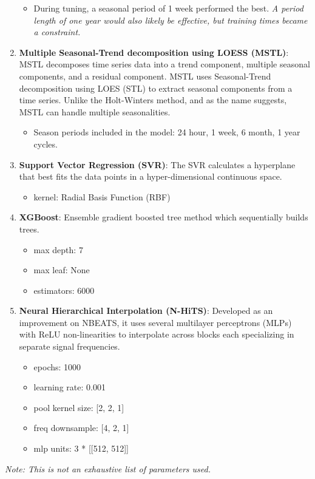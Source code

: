 \documentclass[sigconf]{acmart}
\begin{document}
\begin{enumerate}
      \begin{itemize} %
      \item During tuning, a seasonal period of 1 week performed the best. \textit{A period length of one year would also likely be effective, but training times became a constraint.}
      \end{itemize} %
    \item\textbf{Multiple Seasonal-Trend decomposition using LOESS (MSTL)}: MSTL decomposes time series data into a trend component, multiple seasonal components, and a residual component. MSTL uses Seasonal-Trend decomposition using LOES (STL) to extract seasonal components from a time series. Unlike the Holt-Winters method, and as the name suggests, MSTL can handle multiple seasonalities.
      \begin{itemize} %
      \item Season periods included in the model: 24 hour, 1 week, 6 month, 1 year cycles.
      \end{itemize}  %
    \item\textbf{Support Vector Regression (SVR)}: The SVR calculates a hyperplane that best fits the data points in a hyper-dimensional continuous space.
      \begin{itemize} %
      \item kernel: Radial Basis Function (RBF)
      \end{itemize}  %
    \item\textbf{XGBoost}: Ensemble gradient boosted tree method which sequentially builds trees.
      \begin{itemize} %
      \item max depth: 7
      \item max leaf: None
      \item estimators: 6000 
      \end{itemize} %
    \item\textbf{Neural Hierarchical Interpolation (N-HiTS)}: Developed as an improvement on NBEATS, it uses several multilayer perceptrons (MLPs) with ReLU non-linearities to interpolate across blocks each specializing in separate signal frequencies.
      \begin{itemize} %
      \item epochs: 1000
      \item learning rate: 0.001
      \item pool kernel size: [2, 2, 1]
      \item freq downsample: [4, 2, 1]
      \item mlp units: 3 * [[512, 512]]
      \end{itemize} %
\end{enumerate}
\textit{Note: This is not an exhaustive list of parameters used.}
\end{document}

